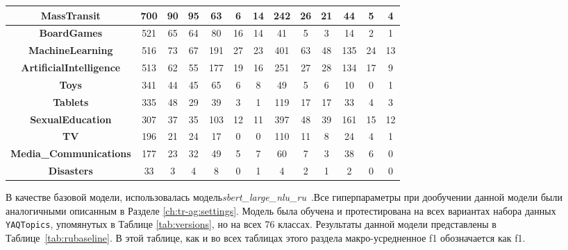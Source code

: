 \begin{table}[t]
{\begin{tabular}{|c||c|c|c||c|c|c||c|c|c||c|c|c|}
\textbf{MassTransit} & 700 & 90 & 95 & 63 & 6 & 14 & 242 & 26 & 21 & 44 & 5 & 4\\ \hline
\textbf{BoardGames} & 521 & 65 & 64 & 80 & 16 & 14 & 41 & 5 & 3 & 14 & 2 & 1\\ \hline
\textbf{MachineLearning} & 516 & 73 & 67 & 191 & 27 & 23 & 401 & 63 & 48 & 135 & 24 & 13\\ \hline
\textbf{ArtificialIntelligence} & 513 & 62 & 55 & 177 & 19 & 16 & 251 & 27 & 28 & 134 & 17 & 9\\ \hline
\textbf{Toys} & 341 & 44 & 45 & 65 & 6 & 8 & 49 & 5 & 6 & 10 & 0 & 1\\ \hline
\textbf{Tablets} & 335 & 48 & 29 & 39 & 3 & 1 & 119 & 17 & 17 & 33 & 4 & 3\\ \hline
\textbf{SexualEducation} & 307 & 37 & 35 & 103 & 12 & 11 & 397 & 48 & 39 & 161 & 15 & 12\\ \hline
\textbf{TV} & 196 & 21 & 24 & 17 & 0 & 0 & 110 & 11 & 8 & 24 & 4 & 1\\ \hline
\textbf{Media\_Communications} & 177 & 23 & 32 & 49 & 5 & 7 & 60 & 7 & 3 & 38 & 6 & 0\\ \hline
\textbf{Disasters} & 33 & 3 & 4 & 8 & 0 & 1 & 4 & 2 & 1 & 2 & 0 & 0\\ \hline
\end{tabular}
}
\end{table}


В качестве базовой модели, использовалась модель\textit{sbert\_large\_nlu\_ru}~\cite{sbert_large_nlu_ru}.Все гиперпараметры при дообучении данной модели были аналогичными описанным в Разделе \ref{ch:tr-ag:settings}. Модель была обучена и протестирована на всех вариантах набора данных \texttt{YAQTopics}, упомянутых в Таблице \ref{tab:versions}, но на всех 76 классах. Результаты данной модели представлены в Таблице~\ref{tab:rubaseline}. В этой таблице, как и во всех таблицах этого раздела макро-усредненное f1 обозначается как f1.


